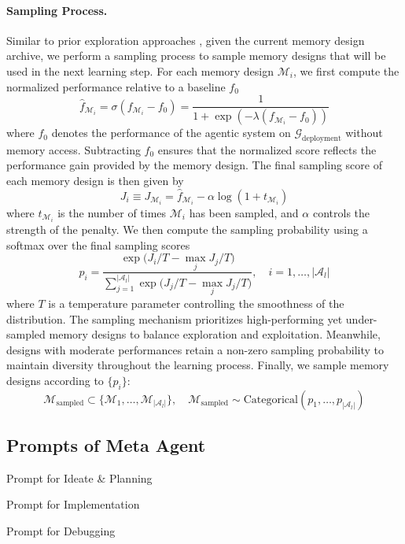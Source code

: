 \documentclass{article}
\theoremstyle{plain}
\theoremstyle{definition}
\theoremstyle{remark}
\begin{document}
\paragraph{Sampling Process.} Similar to prior exploration approaches \citep{ecoffet2021first, zhang2025darwin}, given the current memory design archive, we perform a sampling process to sample memory designs that will be used in the next learning step. 
For each memory design $\mathcal{M}_i$, we first compute the normalized performance relative to a baseline $f_0$
\[
\hat f_{\mathcal{M}_i} = \sigma(f_{\mathcal{M}_i} - f_0) = \frac{1}{1 + \exp(-\lambda (f_{\mathcal{M}_i} - f_0))}
\]
where $f_0$ denotes the performance of the agentic system on $\mathcal{G}_{\text{deployment}}$ without memory access. 
Subtracting $f_0$ ensures that the normalized score reflects the performance gain provided by the memory design.
The final sampling score of each memory design is then given by
\[
J_i \equiv J_{\mathcal{M}_i} = \hat f_{\mathcal{M}_i} - \alpha \log(1 + t_{\mathcal{M}_i})
\]
where $t_{\mathcal{M}_i}$ is the number of times $\mathcal{M}_i$ has been sampled, and $\alpha$ controls the strength of the penalty. 
We then compute the sampling probability using a softmax over the final sampling scores
\[
p_i = \frac{\exp\big(J_i / T - \max_j J_j / T\big)}{\sum_{j=1}^{|\mathcal{A}_l|} \exp\big(J_j / T - \max_j J_j / T\big)} , \quad i = 1, \dots, |\mathcal{A}_l|
\]
where $T$ is a temperature parameter controlling the smoothness of the distribution. The sampling mechanism prioritizes high-performing yet under-sampled memory designs to balance exploration and exploitation. Meanwhile, designs with moderate performances retain a non-zero sampling probability to maintain diversity throughout the learning process.
Finally, we sample memory designs according to $\{p_i\}$:
\[
\mathcal{M}_{\text{sampled}} \subset \{\mathcal{M}_1, \dots, \mathcal{M}_{|\mathcal{A}_l|}\}, \quad 
\mathcal{M}_{\text{sampled}} \sim \text{Categorical}(p_1, \dots, p_{|\mathcal{A}_l|})
\]
\subsection{Prompts of Meta Agent}
\label{prompts_meta}


\begin{topblueprompt}{Prompt for Ideate \& Planning}

\end{topblueprompt}
\begin{topblueprompt}{Prompt for Implementation}

\end{topblueprompt}
\begin{topblueprompt}{Prompt for Debugging}

\end{topblueprompt}
\end{document}
